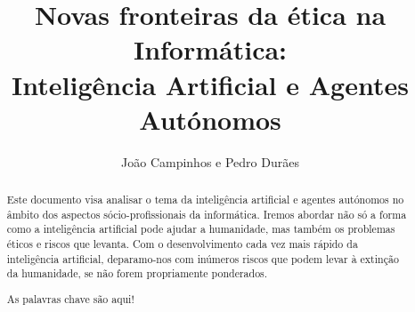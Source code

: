 \documentclass[runningheads,a4paper]{llncs}
\newcommand{\keywords}[1]{\par\addvspace\baselineskip\noindent\keywordname\enspace\ignorespaces#1}
\begin{document}
\mainmatter%

\title{Novas fronteiras da ética na Informática:\\Inteligência Artificial e Agentes Autónomos}


%
%
\author{João Campinhos e Pedro Durães}
%


%
%

\maketitle


\begin{abstract}
  Este documento visa analisar o tema da inteligência artificial e agentes autónomos no âmbito dos aspectos sócio-profissionais da informática.
  Iremos abordar não só a forma como a inteligência artificial pode ajudar a humanidade, mas também os problemas éticos e riscos que levanta.
  Com o desenvolvimento cada vez mais rápido da inteligência artificial, deparamo-nos com inúmeros riscos que podem levar à extinção da humanidade, se não forem propriamente ponderados.
  \keywords{As palavras chave são aqui!}
\end{abstract}
\end{document}
